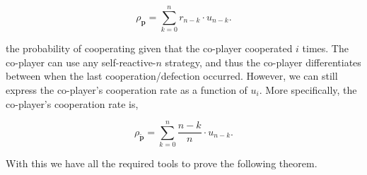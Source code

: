 \documentclass{article}
\theoremstyle{definition}
\begin{document}
\begin{equation}\label{Eq:player_cooperation_counting}
  \rho_{\mathbf{p}} = \sum_{k=0}^{n} r_{n - k} \cdot u_{n - k}.
\end{equation}

the probability of cooperating given that the co-player cooperated $i$ times.
The co-player can use any self-reactive-$n$ strategy, and thus the co-player
differentiates between when the last cooperation/defection occurred. However,
we can still express the co-player's cooperation rate as a function of $u_{i}$.
More specifically, the co-player's cooperation rate is,

\begin{equation}\label{Eq:coplayer_cooperation_counting}
  \rho_{\mathbf{\tilde{p}}} = \sum_{k=0}^{n} \frac{n - k}{n} \cdot u_{n - k}.
\end{equation}

With this we have all the required tools to prove the following theorem.
\end{document}
